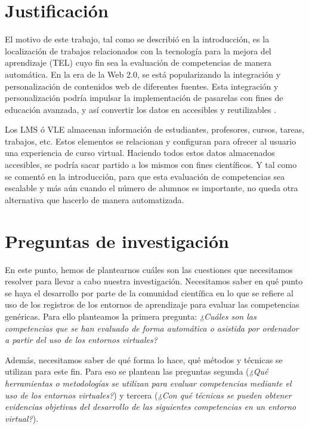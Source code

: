 \section{Justificación}
El motivo de este trabajo, tal como se describió en la introducción, es la localización de trabajos relacionados con la tecnología para la mejora del aprendizaje (TEL) cuyo fin sea la evaluación de competencias de manera automática. En la era de la Web 2.0, se está popularizando la integración y personalización de contenidos web de diferentes fuentes. Esta integración y personalización podría impulsar la implementación de pasarelas con fines de educación avanzada, y así convertir los datos en accesibles y reutilizables \cite{Wenjun:2008}.

Los LMS ó VLE almacenan información de estudiantes, profesores, cursos, tareas, trabajos, etc. Estos elementos se relacionan y configuran para ofrecer al usuario una experiencia de curso virtual. Haciendo todos estos datos almacenados accesibles, se podría sacar partido a los mismos con fines científicos. Y tal como se comentó en la introducción, para que esta evaluación de competencias sea escalable y más aún cuando el número de alumnos es importante, no queda otra alternativa que hacerlo de manera automatizada.


\section{Preguntas de investigación}

En este punto, hemos de plantearnos cuáles son las cuestiones que necesitamos resolver para llevar a cabo nuestra investigación. Necesitamos saber en qué punto se haya el desarrollo por parte de la comunidad científica en lo que se refiere al uso de los registros de los entornos de aprendizaje para evaluar las competencias genéricas. Para ello planteamos la primera pregunta: \emph{¿Cuáles son las competencias que se han evaluado de forma automática o asistida por ordenador a partir del uso de los entornos virtuales?}

Además, necesitamos saber de qué forma lo hace, qué métodos y técnicas se utilizan para este fin. Para eso se plantean las preguntas segunda (\emph{¿Qué herramientas o metodologías se utilizan para evaluar competencias mediante el uso de los entornos virtuales?}) y tercera (\emph{¿Con qué técnicas se pueden obtener evidencias objetivas del desarrollo de las siguientes competencias en un entorno virtual?}).

